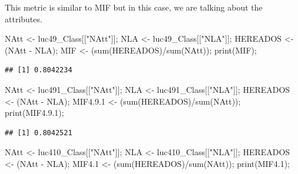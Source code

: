 \documentclass[
]{article}
\newenvironment{Shaded}{\begin{snugshade}}{\end{snugshade}}
\newcommand{\FloatTok}[1]{\textcolor[rgb]{0.00,0.00,0.81}{#1}}
\newcommand{\FunctionTok}[1]{\textcolor[rgb]{0.00,0.00,0.00}{#1}}
\newcommand{\NormalTok}[1]{#1}
\newcommand{\OtherTok}[1]{\textcolor[rgb]{0.56,0.35,0.01}{#1}}
\newcommand{\SpecialCharTok}[1]{\textcolor[rgb]{0.00,0.00,0.00}{#1}}
\newcommand{\StringTok}[1]{\textcolor[rgb]{0.31,0.60,0.02}{#1}}
\begin{document}
This metric is similar to MIF but in this case, we are talking about the
attributes.

\begin{Shaded}
\begin{Highlighting}[]
\NormalTok{NAtt }\OtherTok{\textless{}{-}}\NormalTok{ luc49\_Class[[}\StringTok{"NAtt"}\NormalTok{]];}
\NormalTok{NLA }\OtherTok{\textless{}{-}}\NormalTok{ luc49\_Class[[}\StringTok{"NLA"}\NormalTok{]];}
\NormalTok{HEREADOS }\OtherTok{\textless{}{-}}\NormalTok{ (NAtt }\SpecialCharTok{{-}}\NormalTok{ NLA);}
\NormalTok{MIF }\OtherTok{\textless{}{-}}\NormalTok{ (}\FunctionTok{sum}\NormalTok{(HEREADOS)}\SpecialCharTok{/}\FunctionTok{sum}\NormalTok{(NAtt));}
\FunctionTok{print}\NormalTok{(MIF);}
\end{Highlighting}
\end{Shaded}

\begin{verbatim}
## [1] 0.8042234
\end{verbatim}

\begin{Shaded}
\begin{Highlighting}[]
\NormalTok{NAtt }\OtherTok{\textless{}{-}}\NormalTok{ luc491\_Class[[}\StringTok{"NAtt"}\NormalTok{]];}
\NormalTok{NLA }\OtherTok{\textless{}{-}}\NormalTok{ luc491\_Class[[}\StringTok{"NLA"}\NormalTok{]];}
\NormalTok{HEREADOS }\OtherTok{\textless{}{-}}\NormalTok{ (NAtt }\SpecialCharTok{{-}}\NormalTok{ NLA);}
\NormalTok{MIF4.}\FloatTok{9.1} \OtherTok{\textless{}{-}}\NormalTok{ (}\FunctionTok{sum}\NormalTok{(HEREADOS)}\SpecialCharTok{/}\FunctionTok{sum}\NormalTok{(NAtt));}
\FunctionTok{print}\NormalTok{(MIF4.}\FloatTok{9.1}\NormalTok{);}
\end{Highlighting}
\end{Shaded}

\begin{verbatim}
## [1] 0.8042521
\end{verbatim}

\begin{Shaded}
\begin{Highlighting}[]
\NormalTok{NAtt }\OtherTok{\textless{}{-}}\NormalTok{ luc410\_Class[[}\StringTok{"NAtt"}\NormalTok{]];}
\NormalTok{NLA }\OtherTok{\textless{}{-}}\NormalTok{ luc410\_Class[[}\StringTok{"NLA"}\NormalTok{]];}
\NormalTok{HEREADOS }\OtherTok{\textless{}{-}}\NormalTok{ (NAtt }\SpecialCharTok{{-}}\NormalTok{ NLA);}
\NormalTok{MIF4}\FloatTok{.1} \OtherTok{\textless{}{-}}\NormalTok{ (}\FunctionTok{sum}\NormalTok{(HEREADOS)}\SpecialCharTok{/}\FunctionTok{sum}\NormalTok{(NAtt));}
\FunctionTok{print}\NormalTok{(MIF4}\FloatTok{.1}\NormalTok{);}
\end{Highlighting}
\end{Shaded}
\end{document}
